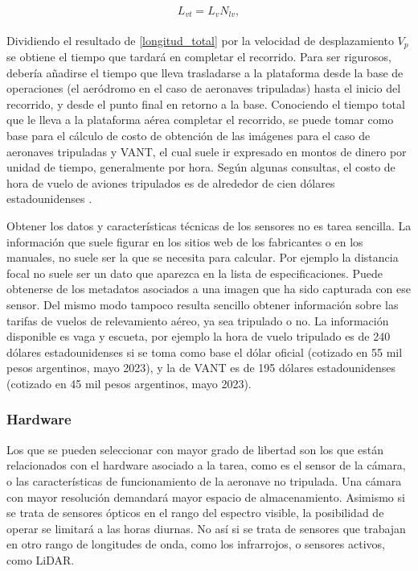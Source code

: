 \\
\begin{equation}
	L_{vt}={L_v}{N_{lv}},\label{longitud_total}
\end{equation}
\\
Dividiendo el resultado de \ref{longitud_total} por la velocidad de desplazamiento $V_p$ se obtiene el tiempo que tardará en completar el recorrido. Para ser rigurosos, debería añadirse el tiempo que lleva trasladarse a la plataforma desde la base de operaciones (el aeródromo en el caso de aeronaves tripuladas) hasta el inicio del recorrido, y desde el punto final en retorno a la base.
Conociendo el tiempo total que le lleva a la plataforma aérea completar el recorrido, se puede tomar como base para el cálculo de costo de obtención de las imágenes para el caso de aeronaves tripuladas y VANT, el cual suele ir expresado en montos de dinero por unidad de tiempo, generalmente por hora. Según algunas consultas, el costo de hora de vuelo de aviones tripulados es de alrededor de cien dólares estadounidenses \cite{}.


Obtener los datos y características técnicas de los sensores no es tarea sencilla. La información que suele figurar en los sitios web de los fabricantes o en los manuales, no suele ser la que se necesita para calcular. Por ejemplo la distancia focal no suele ser un dato que aparezca en la lista de especificaciones. Puede obtenerse de los metadatos asociados a una imagen que ha sido capturada con ese sensor.
Del mismo modo tampoco resulta sencillo obtener información sobre las tarifas de vuelos de relevamiento aéreo, ya sea tripulado o no. La información disponible es vaga y escueta, por ejemplo la hora de vuelo tripulado es de 240 dólares estadounidenses si se toma como base el dólar oficial (cotizado en 55 mil pesos argentinos, mayo 2023), y la de VANT es de 195 dólares estadounidenses (cotizado en 45 mil pesos argentinos, mayo 2023).
\subsubsection{Hardware}
Los que se pueden seleccionar con mayor grado de libertad son los que están relacionados con el hardware asociado a la tarea, como es el sensor de la cámara, o las características de funcionamiento de la aeronave no tripulada. Una cámara con mayor resolución demandará mayor espacio de almacenamiento. Asimismo si se trata de sensores ópticos en el rango del espectro visible, la posibilidad de operar se limitará a las horas diurnas. No así si se trata de sensores que trabajan en otro rango de longitudes de onda, como los infrarrojos, o sensores activos, como LiDAR.
